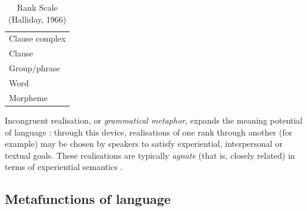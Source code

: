 \begin{table}[ht]
\centering
\begin{tabular}{l}

\toprule
Clause complex       \\
Clause               \\
Group\slash phrase   \\
Word                 \\
Morpheme             \\
\bottomrule
\end{tabular}
\caption[Rank Scale]{Rank Scale (Halliday, 1966)}
\label{tab:rankscale}
\end{table}
%
\noindent Incongruent realisation, or \emph{grammatical metaphor}, expands the meaning potential of language \cite{heyvaert_nominalization_2003}: through this device, realisations of one rank through another (for example) may be chosen by speakers to satisfy experiential, interpersonal or textual goals. These realisations are typically \emph{agnate} (that is, closely related) in terms of experiential semantics \cite{matthiessen_key_2010}.



\subsection{Metafunctions of language}

